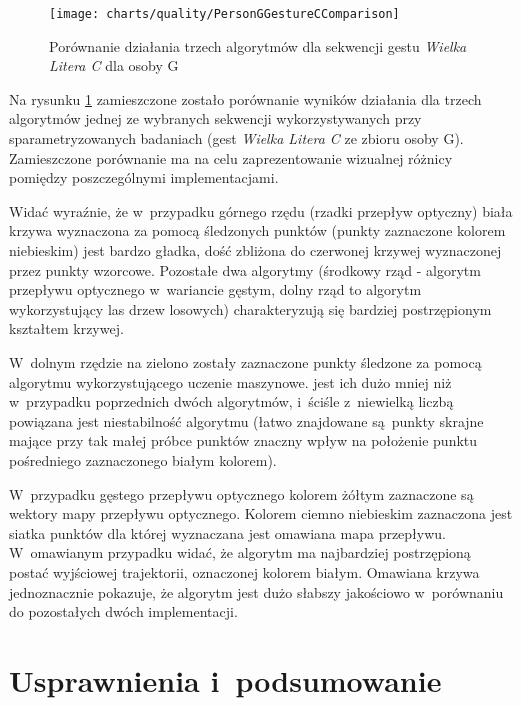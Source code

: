     \newpage

      \begin{figure}[!ht]
        \centering
        \texttt{[image: charts/quality/PersonGGestureCComparison]}
        \caption[Porównanie działania 3 algorytmów dla sekwencji gestu C dla osoby G]
                {Porównanie działania trzech algorytmów dla sekwencji gestu \textit{Wielka Litera C} dla osoby G}
        \label{fig:PersonGGestureCComparison}
      \end{figure}

    \newpage

    Na rysunku \ref{fig:PersonGGestureCComparison} zamieszczone zostało porównanie wyników działania dla trzech algorytmów jednej ze wybranych sekwencji wykorzystywanych przy sparametryzowanych badaniach (gest \textit{Wielka Litera C} ze zbioru osoby G). Zamieszczone porównanie ma na celu zaprezentowanie wizualnej różnicy pomiędzy poszczególnymi implementacjami.

    Widać wyraźnie, że w~przypadku górnego rzędu (rzadki przepływ optyczny) biała krzywa wyznaczona za pomocą śledzonych punktów (punkty zaznaczone kolorem niebieskim) jest bardzo gładka, dość zbliżona do czerwonej krzywej wyznaczonej przez punkty wzorcowe. Pozostałe dwa algorytmy (środkowy rząd - algorytm przepływu optycznego w~wariancie gęstym, dolny rząd to algorytm wykorzystujący las drzew losowych) charakteryzują się bardziej postrzępionym kształtem krzywej.

    W~dolnym rzędzie na zielono zostały zaznaczone punkty śledzone za pomocą algorytmu wykorzystującego uczenie maszynowe. jest ich dużo mniej niż w~przypadku poprzednich dwóch algorytmów, i~ściśle z~niewielką liczbą powiązana jest niestabilność algorytmu (łatwo znajdowane są~punkty skrajne mające przy tak małej próbce punktów znaczny wpływ na położenie punktu pośredniego zaznaczonego białym kolorem).

    W~przypadku gęstego przepływu optycznego kolorem żółtym zaznaczone są wektory mapy przepływu optycznego. Kolorem ciemno niebieskim zaznaczona jest siatka punktów dla której wyznaczana jest omawiana mapa przepływu. W~omawianym przypadku widać, że algorytm ma najbardziej postrzępioną postać wyjściowej trajektorii, oznaczonej kolorem białym. Omawiana krzywa jednoznacznie pokazuje, że algorytm jest dużo słabszy jakościowo w~porównaniu do pozostałych dwóch implementacji.

\chapter{Usprawnienia i~podsumowanie}\label{Chapter_Podsumowanie}


